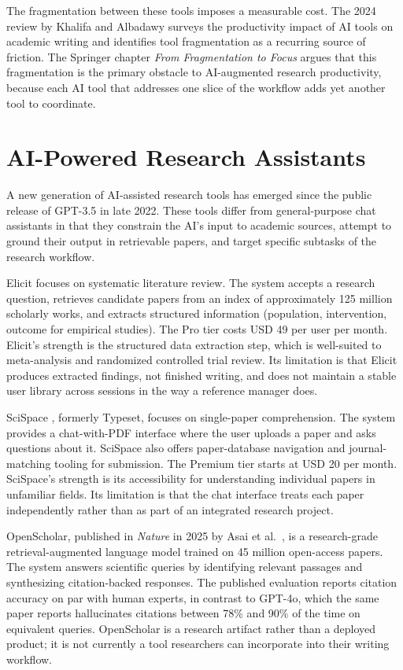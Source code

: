 The fragmentation between these tools imposes a measurable cost. The 2024 review by Khalifa and Albadawy \cite{khalifa2024aiwriting} surveys the productivity impact of AI tools on academic writing and identifies tool fragmentation as a recurring source of friction. The Springer chapter \textit{From Fragmentation to Focus} \cite{springer2024fragmentation} argues that this fragmentation is the primary obstacle to AI-augmented research productivity, because each AI tool that addresses one slice of the workflow adds yet another tool to coordinate.

\section{AI-Powered Research Assistants}
\label{sec:lit-airesearch}

A new generation of AI-assisted research tools has emerged since the public release of GPT-3.5 in late 2022. These tools differ from general-purpose chat assistants in that they constrain the AI's input to academic sources, attempt to ground their output in retrievable papers, and target specific subtasks of the research workflow.

Elicit \cite{elicit2024} focuses on systematic literature review. The system accepts a research question, retrieves candidate papers from an index of approximately 125 million scholarly works, and extracts structured information (population, intervention, outcome for empirical studies). The Pro tier costs USD 49 per user per month. Elicit's strength is the structured data extraction step, which is well-suited to meta-analysis and randomized controlled trial review. Its limitation is that Elicit produces extracted findings, not finished writing, and does not maintain a stable user library across sessions in the way a reference manager does.

SciSpace \cite{scispace2024}, formerly Typeset, focuses on single-paper comprehension. The system provides a chat-with-PDF interface where the user uploads a paper and asks questions about it. SciSpace also offers paper-database navigation and journal-matching tooling for submission. The Premium tier starts at USD 20 per month. SciSpace's strength is its accessibility for understanding individual papers in unfamiliar fields. Its limitation is that the chat interface treats each paper independently rather than as part of an integrated research project.

OpenScholar, published in \textit{Nature} in 2025 by Asai et al.\ \cite{asai2025openscholar}, is a research-grade retrieval-augmented language model trained on 45 million open-access papers. The system answers scientific queries by identifying relevant passages and synthesizing citation-backed responses. The published evaluation reports citation accuracy on par with human experts, in contrast to GPT-4o, which the same paper reports hallucinates citations between 78\% and 90\% of the time on equivalent queries. OpenScholar is a research artifact rather than a deployed product; it is not currently a tool researchers can incorporate into their writing workflow.


